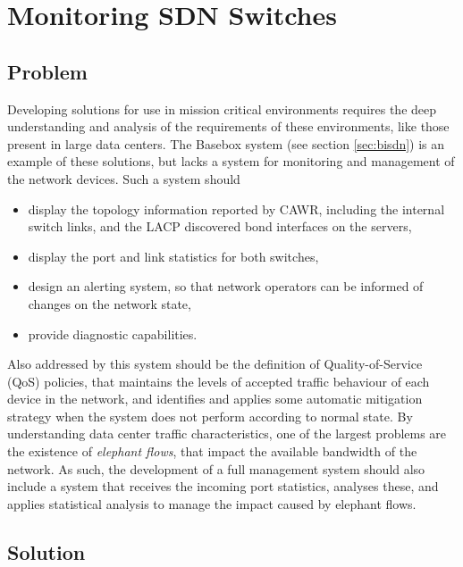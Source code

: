 \chapter{Monitoring SDN Switches} \label{chap:mon_sdn} %

\section {Problem}

Developing solutions for use in mission critical environments requires the deep understanding and analysis of the requirements of these environments, like those
present in large data centers. The Basebox system (see section \ref{sec:bisdn}) is an example of these solutions, but lacks a system for monitoring and management 
of the network devices. Such a system should 

\begin {itemize}
    \item display the topology information reported by CAWR, including the internal switch links, and the LACP discovered bond interfaces on the servers,
    \item display the port and link statistics for both switches,
    \item design an alerting system, so that network operators can be informed of changes on the network state,
    \item provide diagnostic capabilities.
\end {itemize}

\par Also addressed by this system should be the definition of Quality-of-Service (QoS) policies, that maintains the levels of accepted traffic behaviour of each 
device in the network, and identifies and applies some automatic mitigation strategy when the system does not perform according to normal state. By understanding
data center traffic characteristics, one of the largest problems are the existence of \textit{elephant flows}, that impact the available bandwidth of the network.
As such, the development of a full management system should also include a system that receives the incoming port statistics, analyses these, and applies
statistical analysis to manage the impact caused by elephant flows.

\section {Solution}

